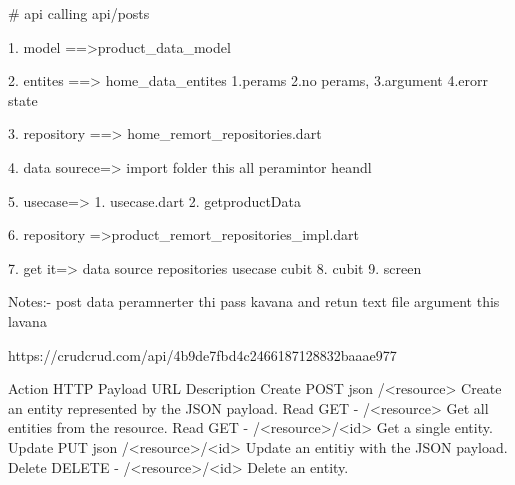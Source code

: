 # api calling api/posts

1. model ==>product_data_model

2. entites ==> home_data_entites
            1.perams
            2.no perams,
            3.argument
            4.erorr state

3. repository ==> home_remort_repositories.dart 

4. data sourece=> import folder this all peramintor heandl

5. usecase=> 1. usecase.dart
          2. getproductData
          
6. repository =>product_remort_repositories_impl.dart

7. get it=>  data source
          repositories
          usecase
          cubit
8. cubit
9. screen

Notes:- post data peramnerter thi pass kavana and retun text file argument this lavana 

https://crudcrud.com/api/4b9de7fbd4c2466187128832baaae977

Action	HTTP	Payload	URL	Description
Create	POST	json	/<resource>	Create an entity represented by the JSON payload.
Read	GET	-	/<resource>	Get all entities from the resource.
Read	GET	-	/<resource>/<id>	Get a single entity.
Update	PUT	json	/<resource>/<id>	Update an entitiy with the JSON payload.
Delete	DELETE	-	/<resource>/<id>	Delete an entity.